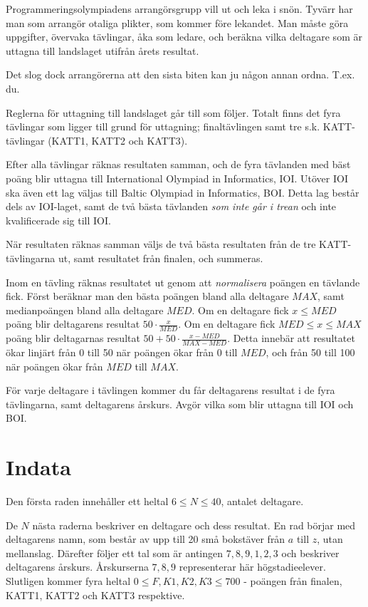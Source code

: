 Programmeringsolympiadens arrangörsgrupp vill ut och leka i snön.
Tyvärr har man som arrangör otaliga plikter, som kommer före lekandet.
Man måste göra uppgifter, övervaka tävlingar, åka som ledare, och beräkna vilka deltagare som är uttagna till landslaget utifrån årets resultat.

Det slog dock arrangörerna att den sista biten kan ju någon annan ordna.
T.ex. du.

Reglerna för uttagning till landslaget går till som följer.
Totalt finns det fyra tävlingar som ligger till grund för uttagning; finaltävlingen samt tre s.k. KATT-tävlingar (KATT1, KATT2 och KATT3).

Efter alla tävlingar räknas resultaten samman, och de fyra tävlanden med bäst poäng blir uttagna till International Olympiad in Informatics, IOI.
Utöver IOI ska även ett lag väljas till Baltic Olympiad in Informatics, BOI.
Detta lag består dels av IOI-laget, samt de två bästa tävlanden \emph{som inte går i trean} och inte kvalificerade sig till IOI.

När resultaten räknas samman väljs de två bästa resultaten från de tre KATT-tävlingarna ut, samt resultatet från finalen, och summeras.

Inom en tävling räknas resultatet ut genom att \emph{normalisera} poängen en tävlande fick.
Först beräknar man den bästa poängen bland alla deltagare $MAX$, samt medianpoängen bland alla deltagare $MED$.
Om en deltagare fick $x \le MED$ poäng blir deltagarens resultat $50 \cdot \frac{x}{MED}$.
Om en deltagare fick $MED \le x \le MAX$ poäng blir deltagarnas resultat $50 + 50 \cdot \frac{x - MED}{MAX - MED}$.
Detta innebär att resultatet ökar linjärt från 0 till 50 när poängen ökar från 0 till $MED$,
och från 50 till 100 när poängen ökar från $MED$ till $MAX$.

För varje deltagare i tävlingen kommer du får deltagarens resultat i de fyra tävlingarna, samt deltagarens årskurs. Avgör vilka som blir uttagna till IOI och BOI.

\section*{Indata}
Den första raden innehåller ett heltal $6 \le N \le 40$, antalet deltagare.

De $N$ nästa raderna beskriver en deltagare och dess resultat.
En rad börjar med deltagarens namn, som består av upp till 20 små bokstäver från $a$ till $z$, utan mellanslag.
Därefter följer ett tal som är antingen $7, 8, 9, 1, 2, 3$ och beskriver deltagarens årskurs. Årskurserna $7, 8, 9$ representerar här högstadieelever.
Slutligen kommer fyra heltal $0 \le F, K1, K2, K3 \le 700$ - poängen från finalen, KATT1, KATT2 och KATT3 respektive.

